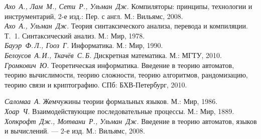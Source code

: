 
\begin{thebibliography}{9}


 \emph{Ахо~А., Лам~М., Сети~Р., Ульман~Дж.} Компиляторы: принципы, технологии и инструментарий, 2-е изд.: Пер. с англ. М.: Вильямс, 2008. \\

 \emph{Ахо~А., Ульман~Дж.} Теория синтаксического анализа, перевода и компиляции. Т.~1. Синтаксический анализ. М.: Мир, 1978. \\

 \emph{Бауэр~Ф.\,Л., Гооз~Г.} Информатика. М.: Мир, 1990. \\

 \emph{Белоусов~А.\,И., Ткачёв~С.\,Б.} Дискретная математика. М.: МГТУ, 2010.\\

 \emph{Громкович~Ю.} Теоретическая информатика. Введение в теорию автоматов, теорию вычислимости, теорию сложности, теорию алгоритмов, рандомизацию, теорию связи и криптографию. СПб: БХВ-Петербург, 2010.

 \emph{Саломаа~А.} Жемчужины теории формальных языков. М.: Мир, 1986. \\


 \emph{Хоар~Ч.} Взаимодействующие последовательные процессы. М.: Мир, 1889.\\

 \emph{Хопкрофт~Дж., Мотвани~Р., Ульман~Дж.}  Введение в теорию автоматов, языков и
вычислений. — 2-е изд. М.: Вильямс, 2008.\\


\end{thebibliography}
